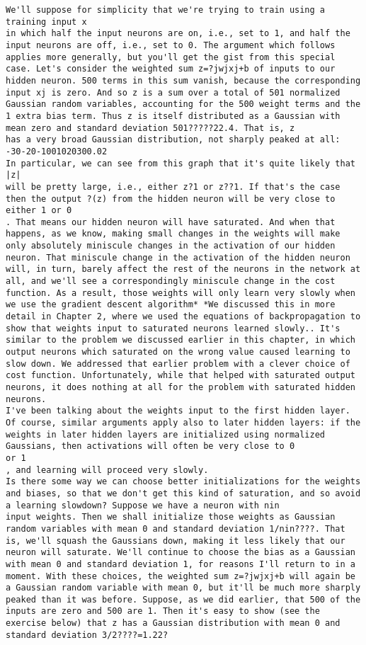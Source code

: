 \begin{lstlisting}
We'll suppose for simplicity that we're trying to train using a training input x
in which half the input neurons are on, i.e., set to 1, and half the input neurons are off, i.e., set to 0. The argument which follows applies more generally, but you'll get the gist from this special case. Let's consider the weighted sum z=?jwjxj+b of inputs to our hidden neuron. 500 terms in this sum vanish, because the corresponding input xj is zero. And so z is a sum over a total of 501 normalized Gaussian random variables, accounting for the 500 weight terms and the 1 extra bias term. Thus z is itself distributed as a Gaussian with mean zero and standard deviation 501?????22.4. That is, z
has a very broad Gaussian distribution, not sharply peaked at all:
-30-20-1001020300.02
In particular, we can see from this graph that it's quite likely that |z|
will be pretty large, i.e., either z?1 or z??1. If that's the case then the output ?(z) from the hidden neuron will be very close to either 1 or 0
. That means our hidden neuron will have saturated. And when that happens, as we know, making small changes in the weights will make only absolutely miniscule changes in the activation of our hidden neuron. That miniscule change in the activation of the hidden neuron will, in turn, barely affect the rest of the neurons in the network at all, and we'll see a correspondingly miniscule change in the cost function. As a result, those weights will only learn very slowly when we use the gradient descent algorithm* *We discussed this in more detail in Chapter 2, where we used the equations of backpropagation to show that weights input to saturated neurons learned slowly.. It's similar to the problem we discussed earlier in this chapter, in which output neurons which saturated on the wrong value caused learning to slow down. We addressed that earlier problem with a clever choice of cost function. Unfortunately, while that helped with saturated output neurons, it does nothing at all for the problem with saturated hidden neurons.
I've been talking about the weights input to the first hidden layer. Of course, similar arguments apply also to later hidden layers: if the weights in later hidden layers are initialized using normalized Gaussians, then activations will often be very close to 0
or 1
, and learning will proceed very slowly.
Is there some way we can choose better initializations for the weights and biases, so that we don't get this kind of saturation, and so avoid a learning slowdown? Suppose we have a neuron with nin
input weights. Then we shall initialize those weights as Gaussian random variables with mean 0 and standard deviation 1/nin????. That is, we'll squash the Gaussians down, making it less likely that our neuron will saturate. We'll continue to choose the bias as a Gaussian with mean 0 and standard deviation 1, for reasons I'll return to in a moment. With these choices, the weighted sum z=?jwjxj+b will again be a Gaussian random variable with mean 0, but it'll be much more sharply peaked than it was before. Suppose, as we did earlier, that 500 of the inputs are zero and 500 are 1. Then it's easy to show (see the exercise below) that z has a Gaussian distribution with mean 0 and standard deviation 3/2????=1.22?

\end{lstlisting}
